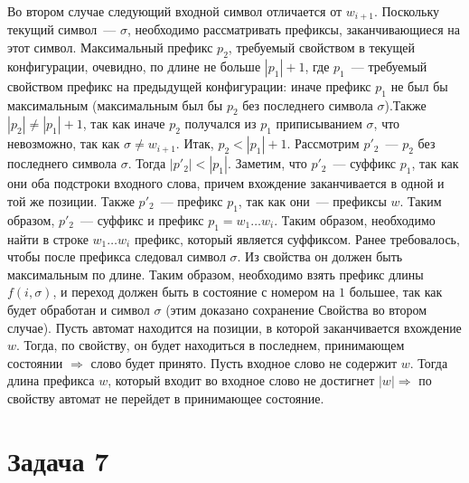 \documentclass[a4paper]{article}
\begin{document}
Во втором случае следующий входной символ отличается от $w_{i+1}$. Поскольку текущий символ~--- $\sigma$, необходимо рассматривать префиксы, заканчивающиеся на этот символ. Максимальный префикс $p_2$, требуемый свойством в текущей конфигурации, очевидно, по длине не больше $|p_1|+1$, где $p_1$~--- требуемый свойством префикс на предыдущей конфигурации: иначе префикс $p_1$ не был бы максимальным (максимальным был бы $p_2$ без последнего символа $\sigma$).\newline Также $|p_2|\neq|p_1|+1$, так как иначе $p_2$ получался из $p_1$ приписыванием $\sigma$, что невозможно, так как $\sigma\neq w_{i+1}$. Итак, $p_2<|p_1|+1$. Рассмотрим $p'_2$~--- $p_2$ без последнего символа $\sigma$. Тогда $|p'_2|<|p_1|$.\newline
Заметим, что $p'_2$~--- суффикс $p_1$, так как они оба подстроки входного слова, причем вхождение заканчивается в одной и той же позиции. Также $p'_2$~--- префикс $p_1$, так как они~--- префиксы $w$. Таким образом, $p'_2$~--- суффикс и префикс $p_1=w_1\dots w_i$. Таким образом, необходимо найти в строке $w_1\dots w_i$ префикс, который является суффиксом. Ранее требовалось, чтобы после префикса следовал символ $\sigma$. Из свойства он должен быть максимальным по длине. Таким образом, необходимо взять префикс длины $f(i,\sigma)$, и переход должен быть в состояние с номером на $1$ большее, так как будет обработан и символ $\sigma$ (этим доказано сохранение Свойства во втором случае).\newline
Пусть автомат находится на позиции, в которой заканчивается вхождение $w$. Тогда, по свойству, он будет находиться в последнем, принимающем состоянии $\Rightarrow$ слово будет принято.\newline
Пусть входное слово не содержит $w$. Тогда длина префикса $w$, который входит во входное слово не достигнет $|w|\Rightarrow$ по свойству автомат не перейдет в принимающее состояние.
\newpage
\section*{Задача 7}
\end{document}
